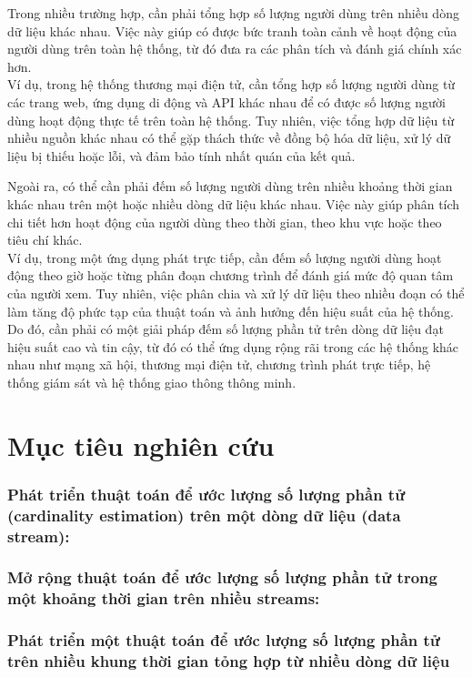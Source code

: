 \documentclass[a4paper,13pt]{article}
\theoremstyle{mytheor}
\begin{document}
Trong nhiều trường hợp, cần phải tổng hợp số lượng người dùng trên nhiều dòng dữ liệu khác nhau. Việc này giúp có được bức tranh toàn cảnh về hoạt động 
của người dùng trên toàn hệ thống, từ đó đưa ra các phân tích và đánh giá chính xác hơn.\\
Ví dụ, trong hệ thống thương mại điện tử, cần tổng hợp số lượng người dùng từ các trang web, ứng dụng di động và API khác nhau để có được số lượng 
người dùng hoạt động thực tế trên toàn hệ thống. 
Tuy nhiên, việc tổng hợp dữ liệu từ nhiều nguồn khác nhau có thể gặp thách thức về đồng bộ hóa dữ liệu, xử lý dữ liệu bị thiếu hoặc lỗi, 
và đảm bảo tính nhất quán của kết quả. 

Ngoài ra, có thể cần phải đếm số lượng người dùng trên nhiều khoảng thời gian khác nhau trên một hoặc nhiều dòng dữ liệu khác nhau. 
Việc này giúp phân tích chi tiết hơn hoạt động của người dùng theo thời gian, theo khu vực hoặc theo tiêu chí khác.\\
Ví dụ, trong một ứng dụng phát trực tiếp, cần đếm số lượng người dùng hoạt động theo giờ hoặc từng phân đoạn chương trình 
để đánh giá mức độ quan tâm của người xem. Tuy nhiên, việc phân chia và xử lý dữ liệu theo nhiều đoạn có thể làm 
tăng độ phức tạp của thuật toán và ảnh hưởng đến hiệu suất của hệ thống. Do đó, cần phải có một giải pháp 
đếm số lượng phần tử trên dòng dữ liệu đạt hiệu suất cao và tin cậy, từ đó có thể ứng dụng rộng rãi trong các 
hệ thống khác nhau như mạng xã hội, thương mại điện tử, chương trình phát trực tiếp, hệ thống giám sát 
và hệ thống giao thông thông minh.

\section{Mục tiêu nghiên cứu}
\subsubsection{Phát triển thuật toán để ước lượng số lượng phần tử (cardinality estimation) trên một dòng dữ liệu (data stream):}
\subsubsection{Mở rộng thuật toán để ước lượng số lượng phần tử trong một khoảng thời gian trên nhiều streams:}
\subsubsection{Phát triển một thuật toán để ước lượng số lượng phần tử trên nhiều khung thời gian tỏng hợp từ nhiều dòng dữ liệu}
\end{document}
